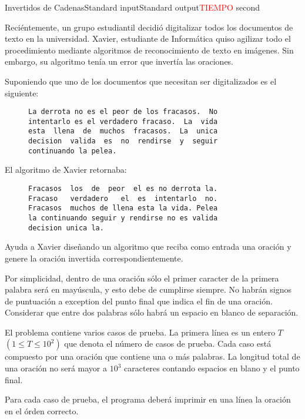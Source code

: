 \begin{problem}{Invertidos de Cadenas}{Standard input}{Standard output}{\textcolor{red}{TIEMPO} second}{}


Reciéntemente, un grupo estudiantil decidió digitalizar todos los documentos de texto en la universidad. Xavier, estudiante de Informática quiso agilizar todo el procedimiento mediante algoritmos de reconocimiento de texto en imágenes. Sin embargo, su algoritmo tenía un error que invertía las oraciones.

Suponiendo que uno de los documentos que necesitan ser digitalizados es el siguiente:

\begin{figure}[htb]
\centering
\begin{BVerbatim}
La derrota no es el peor de los fracasos.  No
intentarlo es el verdadero fracaso.  La  vida 
esta  llena  de  muchos  fracasos.  La  unica 
decision  valida  es  no  rendirse  y  seguir
continuando la pelea.
\end{BVerbatim}
\end{figure}

El algoritmo de Xavier retornaba:
\begin{figure}[htb]
\centering
\begin{BVerbatim}
Fracasos  los  de  peor  el es no derrota la.
Fracaso   verdadero   el  es  intentarlo  no.
Fracasos  muchos de llena esta la vida. Pelea
la continuando seguir y rendirse no es valida
decision unica la.
\end{BVerbatim}
\end{figure}

Ayuda a Xavier diseñando un algoritmo que reciba como entrada una oración y genere la oración invertida correspondientemente.

Por simplicidad, dentro de una oración sólo el primer caracter de la primera palabra será en mayúscula, y esto debe de cumplirse siempre. No habrán signos de puntuación a exception del punto final que indica el fin de una oración. Considerar que entre dos palabras sólo habrá un espacio en blanco de separación.

\InputFile
El problema contiene varios casos de prueba. La primera l\'inea es un entero $T$ $(1\leq T \leq 10^2)$ que denota el número de casos de prueba. Cada caso está compuesto por una oración que contiene una o más palabras. La longitud total de una oración no será mayor a $10^3$ caracteres contando espacios en blano y el punto final.

\OutputFile
Para cada caso de prueba, el programa deberá imprimir en una línea la oración en el órden correcto. 

\Example

\begin{example}
\end{example}

\end{problem}

